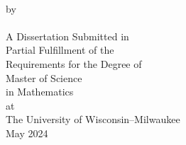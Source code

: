 \begin{center}
{\Large \mytitle}
    \\
    \vspace{0.6\baselineskip}
    by\\
    \myauthor \\
    \vspace{2in}
    A Dissertation Submitted in\\
    Partial Fulfillment of the\\
    Requirements for the Degree of\\
    \vspace{0.5in}
    Master of Science\\
    in Mathematics\\
    \vspace{0.5in}
    at\\
    The University of Wisconsin--Milwaukee\\
    May 2024\\
\end{center}